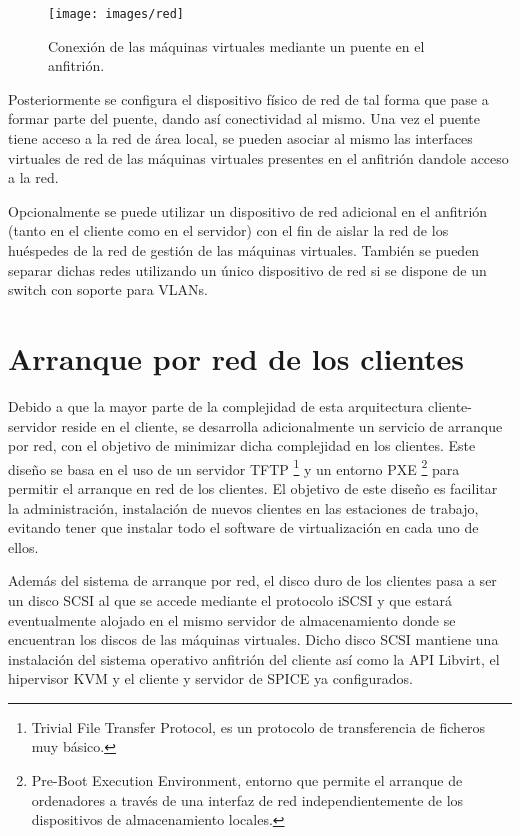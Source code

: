 \documentclass[spanisheDIVcalc,twoside,parskip-,pointlessnumbers,final]{scrbook}
\begin{document}
\begin{figure}[htpb]
\begin{centering}
\texttt{[image: images/red]}
\par\end{centering}

\caption{Conexión de las máquinas virtuales mediante un puente en el anfitrión.}
\label{conexion mediante un puente externo}
\end{figure}


Posteriormente se configura el dispositivo físico de red de tal forma
que pase a formar parte del puente, dando así conectividad al mismo.
Una vez el puente tiene acceso a la red de área local, se pueden asociar
al mismo las interfaces virtuales de red de las máquinas virtuales
presentes en el anfitrión dandole acceso a la red.

Opcionalmente se puede utilizar un dispositivo de red adicional en
el anfitrión (tanto en el cliente como en el servidor) con el fin
de aislar la red de los huéspedes de la red de gestión de las máquinas
virtuales. También se pueden separar dichas redes utilizando un único
dispositivo de red si se dispone de un switch con soporte para VLANs.


\section{Arranque por red de los clientes}

Debido a que la mayor parte de la complejidad de esta arquitectura
cliente-servidor reside en el cliente, se desarrolla adicionalmente
un servicio de arranque por red, con el objetivo de minimizar dicha
complejidad en los clientes. Este diseño se basa en el uso de un servidor
TFTP%
\footnote{Trivial File Transfer Protocol, es un protocolo de transferencia de
ficheros muy básico. %
} y un entorno PXE%
\footnote{Pre-Boot Execution Environment, entorno que permite el arranque de
ordenadores a través de una interfaz de red independientemente de
los dispositivos de almacenamiento locales.%
} para permitir el arranque en red de los clientes. El objetivo de
este diseño es facilitar la administración, instalación de nuevos
clientes en las estaciones de trabajo, evitando tener que instalar
todo el software de virtualización en cada uno de ellos. 

Además del sistema de arranque por red, el disco duro de los clientes
pasa a ser un disco SCSI al que se accede mediante el protocolo iSCSI
y que estará eventualmente alojado en el mismo servidor de almacenamiento
donde se encuentran los discos de las máquinas virtuales. Dicho disco
SCSI mantiene una instalación del sistema operativo anfitrión del
cliente así como la API Libvirt, el hipervisor KVM y el cliente y
servidor de SPICE ya configurados.
\end{document}
